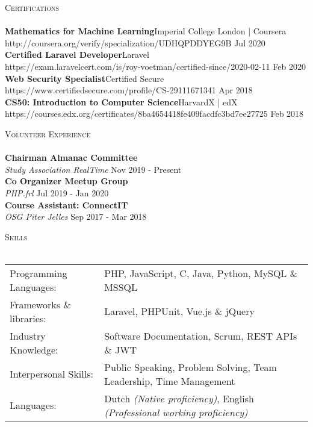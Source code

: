 \documentclass[a4paper]{article}
\newcommand{\lineunder} {
    \vspace*{-8pt} \\
    \hspace*{-18pt} \hrulefill \\
}
\newcommand{\header} [1] {
    {\hspace*{-18pt}\vspace*{6pt} \textsc{#1}}
    \vspace*{-6pt} \lineunder
}
\begin{document}
\header{Certifications}
\textbf{Mathematics for Machine Learning}\hfill Imperial College London | Coursera\\
http://coursera.org/verify/specialization/UDHQPDDYEG9B \hfill Jul 2020\\
\vspace{2mm}
\textbf{Certified Laravel Developer}\hfill Laravel\\
https://exam.laravelcert.com/is/roy-voetman/certified-since/2020-02-11 \hfill Feb 2020\\
\vspace{2mm}
\textbf{Web Security Specialist}\hfill Certified Secure\\
https://www.certifiedsecure.com/profile/CS-29111671341 \hfill Apr 2018\\
\vspace{2mm}
\textbf{CS50: Introduction to Computer Science}\hfill HarvardX | edX\\
https://courses.edx.org/certificates/8ba4654418fe409facdfc3bd7ee27725 \hfill Feb 2018\\
\vspace{2mm}

\header{Volunteer Experience}
\vspace{1mm}
\textbf{Chairman Almanac Committee} \hfill\\
\textit{Study Association RealTime} \hfill Nov 2019 - Present\\
\vspace{2mm}
\textbf{Co Organizer Meetup Group} \hfill\\
\textit{PHP.frl} \hfill Jul 2019 - Jan 2020\\
\vspace{2mm}
\textbf{Course Assistant: ConnectIT} \hfill\\
\textit{OSG Piter Jelles} \hfill Sep 2017 - Mar 2018\\
\vspace{2mm}

\header{Skills}
\begin{tabular}{l l}
	Programming Languages:   & PHP, JavaScript, C, Java, Python, MySQL \& MSSQL                     \\
    Frameworks \& libraries: & Laravel, PHPUnit, Vue.js \& jQuery                                   \\
	Industry Knowledge:      & Software Documentation, Scrum, REST APIs \& JWT    \\
	Interpersonal Skills:    & Public Speaking, Problem Solving, Team Leadership, Time Management \\
    Languages:               & Dutch \emph{(Native proficiency)}, English \emph{(Professional working proficiency)}\\
\end{tabular}
\vspace{2mm}
\end{document}
